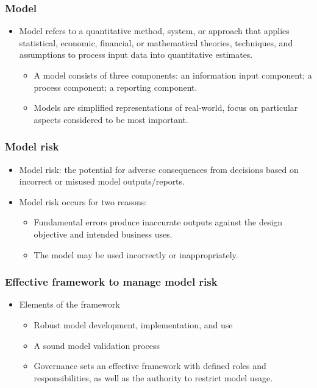 \subsubsection{Model}
\begin{itemize}
\item Model refers to a quantitative method, system, or approach that applies statistical, economic, financial, or mathematical theories, techniques, and assumptions to process input data into quantitative estimates.
    \begin{itemize}
    \item A model consists of three components: an information input component; a process component; a reporting
    component.
    \item Models are simplified representations of real-world, focus on particular aspects considered to be most important.
    \end{itemize}
\end{itemize}




\subsubsection{Model risk}
\begin{itemize}
\item Model risk: the potential for adverse consequences from decisions based on incorrect or misused model outputs/reports.
\item Model risk occurs for two reasons:
    \begin{itemize}
    \item Fundamental errors produce inaccurate outputs against the design objective and intended business uses.
    \item The model may be used incorrectly or inappropriately.
    \end{itemize}
\end{itemize}




\subsubsection{Effective framework to manage model risk}
\begin{itemize}
\item  Elements of the framework
    \begin{itemize}
    \item Robust model development, implementation, and use
    \item A sound model validation process
    \item Governance sets an effective framework with defined roles and responsibilities, as well as the authority to restrict model usage.
    \end{itemize}
\end{itemize}




